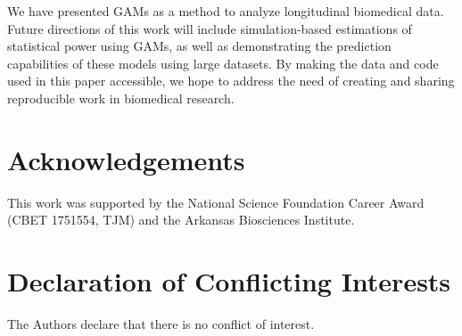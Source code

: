 \documentclass[Royal,times,doublespace,sagev]{sagej}
\begin{document}
We have presented GAMs as a method to analyze longitudinal biomedical data. Future directions of this work will include simulation-based estimations of statistical power using GAMs, as well as demonstrating the prediction capabilities of these models using large datasets.
By making the data and code used in this paper accessible, we hope to address the need of creating and sharing reproducible work in biomedical research.

\hypertarget{acknowledgements}{%
\section{Acknowledgements}\label{acknowledgements}}

This work was supported by the National Science Foundation Career Award (CBET 1751554, TJM) and the Arkansas Biosciences Institute.

\hypertarget{declaration-of-conflicting-interests}{%
\section{Declaration of Conflicting Interests}\label{declaration-of-conflicting-interests}}

The Authors declare that there is no conflict of interest.


\end{document}
